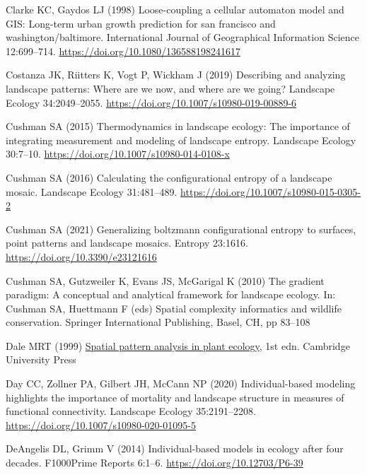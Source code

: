 \documentclass[
  10pt,
  a4paperpaper,
]{article}
\newlength{\cslhangindent}
\newenvironment{CSLReferences}[2] %
 {\begin{list}{}{%
  \setlength{\itemindent}{0pt}
  \setlength{\leftmargin}{0pt}
  \setlength{\parsep}{0pt}
  \ifodd #1
   \setlength{\leftmargin}{\cslhangindent}
   \setlength{\itemindent}{-1\cslhangindent}
  \fi
  \setlength{\itemsep}{#2\baselineskip}}}
 {\end{list}}
\begin{document}
\begin{CSLReferences}{1}{1}
Clarke KC, Gaydos LJ (1998) Loose-coupling a cellular automaton model
and GIS: Long-term urban growth prediction for san francisco and
washington/baltimore. International Journal of Geographical Information
Science 12:699--714. \url{https://doi.org/10.1080/136588198241617}

Costanza JK, Riitters K, Vogt P, Wickham J (2019) Describing and
analyzing landscape patterns: Where are we now, and where are we going?
Landscape Ecology 34:2049--2055.
\url{https://doi.org/10.1007/s10980-019-00889-6}

Cushman SA (2015) Thermodynamics in landscape ecology: The importance of
integrating measurement and modeling of landscape entropy. Landscape
Ecology 30:7--10. \url{https://doi.org/10.1007/s10980-014-0108-x}

Cushman SA (2016) Calculating the configurational entropy of a landscape
mosaic. Landscape Ecology 31:481--489.
\url{https://doi.org/10.1007/s10980-015-0305-2}

Cushman SA (2021) Generalizing boltzmann configurational entropy to
surfaces, point patterns and landscape mosaics. Entropy 23:1616.
\url{https://doi.org/10.3390/e23121616}

Cushman SA, Gutzweiler K, Evans JS, McGarigal K (2010) The gradient
paradigm: A conceptual and analytical framework for landscape ecology.
In: Cushman SA, Huettmann F (eds) Spatial complexity informatics and
wildlife conservation. Springer International Publishing, Basel, CH, pp
83--108

Dale MRT (1999) \href{https://doi.org/10.1017/CBO9780511612589}{Spatial
pattern analysis in plant ecology}, 1st edn. Cambridge University Press

Day CC, Zollner PA, Gilbert JH, McCann NP (2020) Individual-based
modeling highlights the importance of mortality and landscape structure
in measures of functional connectivity. Landscape Ecology 35:2191--2208.
\url{https://doi.org/10.1007/s10980-020-01095-5}

DeAngelis DL, Grimm V (2014) Individual-based models in ecology after
four decades. F1000Prime Reports 6:1--6.
\url{https://doi.org/10.12703/P6-39}


\end{CSLReferences}
\end{document}

